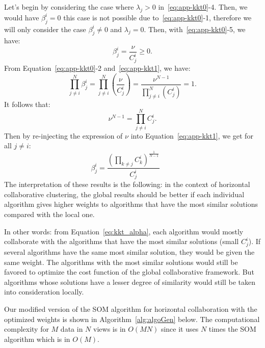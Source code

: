 Let's begin by considering the case where $\lambda_j > 0$ in~\eqref{eq:app-kkt0}-4. Then, we would have $\beta_j^i=0$  this case is not possible due to~\eqref{eq:app-kkt0}-1, therefore we will only consider the case $\beta_j^i \neq 0$ and $\lambda_j=0$. Then, with~\eqref{eq:app-kkt0}-5, we have:
\begin{equation}
    \beta_j^i  =   \frac{\nu} { C_j^i } \geq 0.
    \label{eq:app-kkt1}
\end{equation}
From Equation~\eqref{eq:app-kkt0}-2 and~\eqref{eq:app-kkt1}, we have:
\begin{equation}
    \prod_{j \neq i}^N   \beta_j^i  = \prod_{j \neq i}^N  \left(\frac{\nu}{C_j^i } \right)=\frac{\nu^{N-1}} { \prod_{j \neq i}^N  \left( {C_j^i } \right)}  =1.
\end{equation}
It follows that:
$$
\nu^{N-1}  =     \prod_{j \neq i}^N   C_j^i . 
$$
Then by re-injecting the expression of $\nu$ into Equation~\eqref{eq:app-kkt1}, we get for  all  $ j \neq i$:
\begin{equation}
\beta_j^i =  \frac{{(\prod_{k\neq j} C_k^i)}^{\frac 1 {N-1}}} {C_j^i} \qquad
\label{eq:kkt_alpha}
\end{equation} 
The interpretation of these results is the following: 
in the context of horizontal collaborative clustering, the global results should be better if each individual algorithm gives higher weights to algorithms that have the most similar solutions compared with the local one.

In other words: from Equation~\eqref{eq:kkt_alpha}, each algorithm would mostly collaborate with the algorithms that have the most similar solutions (small $C_j^i$). If several algorithms have the same most similar solution, they would be given the same weight.  The algorithms with the most similar solutions would still be favored to optimize the cost function of the global collaborative framework. But algorithms whose solutions have a lesser degree of similarity would still be taken into consideration locally. 


\medskip
Our modified version of the SOM algorithm for horizontal collaboration with the optimized weights is shown in Algorithm~\ref{alg:algoGen} below. The computational complexity for $M$ data in $N$ views is in $O(MN)$ since it uses $N$ times the SOM algorithm which is in $O(M)$.

